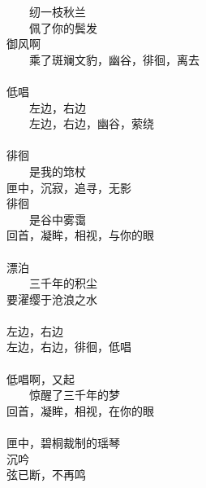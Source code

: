 　　纫一枝秋兰 \\
　　佩了你的鬓发 \\
御风啊 \\
　　乘了斑斓文豹，幽谷，徘徊，离去 \\
\\
低唱 \\
　　左边，右边 \\
　　左边，右边，幽谷，萦绕 \\
\\
徘徊 \\
　　是我的筇杖 \\
匣中，沉寂，追寻，无影 \\
徘徊 \\
　　是谷中雾霭 \\
回首，凝眸，相视，与你的眼 \\
\\
漂泊 \\
　　三千年的积尘 \\
要濯缨于沧浪之水 \\
\\
左边，右边 \\
左边，右边，徘徊，低唱 \\
\\
低唱啊，又起 \\
　　惊醒了三千年的梦 \\
回首，凝眸，相视，在你的眼 \\
\\
匣中，碧桐裁制的瑶琴 \\
沉吟 \\
弦已断，不再鸣
